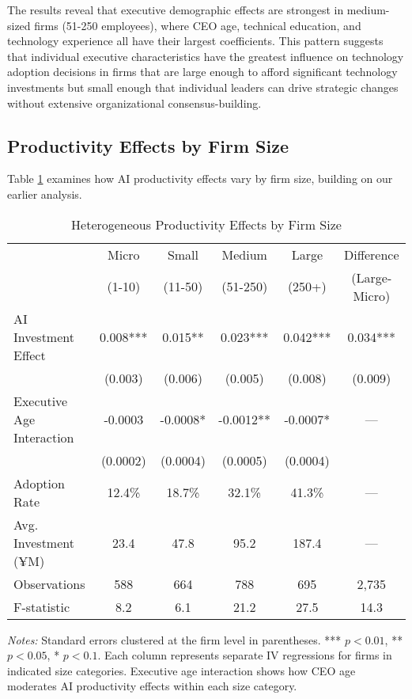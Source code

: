 \documentclass[12pt, a4paper]{article}
\begin{document}
The results reveal that executive demographic effects are strongest in medium-sized firms (51-250 employees), where CEO age, technical education, and technology experience all have their largest coefficients. This pattern suggests that individual executive characteristics have the greatest influence on technology adoption decisions in firms that are large enough to afford significant technology investments but small enough that individual leaders can drive strategic changes without extensive organizational consensus-building.

\subsection{Productivity Effects by Firm Size}

Table \ref{tab:size_heterogeneity} examines how AI productivity effects vary by firm size, building on our earlier analysis.

\begin{table}[H]
\centering
\caption{Heterogeneous Productivity Effects by Firm Size}
\label{tab:size_heterogeneity}
\begin{tabular}{lccccc}
\toprule
 & Micro & Small & Medium & Large & Difference \\
 & (1-10) & (11-50) & (51-250) & (250+) & (Large-Micro) \\
\midrule
AI Investment Effect & 0.008*** & 0.015** & 0.023*** & 0.042*** & 0.034*** \\
 & (0.003) & (0.006) & (0.005) & (0.008) & (0.009) \\
Executive Age Interaction & -0.0003 & -0.0008* & -0.0012** & -0.0007* & --- \\
 & (0.0002) & (0.0004) & (0.0005) & (0.0004) & \\
\midrule
Adoption Rate & 12.4\% & 18.7\% & 32.1\% & 41.3\% & --- \\
Avg. Investment (¥M) & 23.4 & 47.8 & 95.2 & 187.4 & --- \\
\midrule
Observations & 588 & 664 & 788 & 695 & 2,735 \\
F-statistic & 8.2 & 6.1 & 21.2 & 27.5 & 14.3 \\
\bottomrule
\end{tabular}
\begin{minipage}{\textwidth}
\footnotesize
\textit{Notes:} Standard errors clustered at the firm level in parentheses. *** $p<0.01$, ** $p<0.05$, * $p<0.1$. Each column represents separate IV regressions for firms in indicated size categories. Executive age interaction shows how CEO age moderates AI productivity effects within each size category.
\end{minipage}
\end{table}
\end{document}
